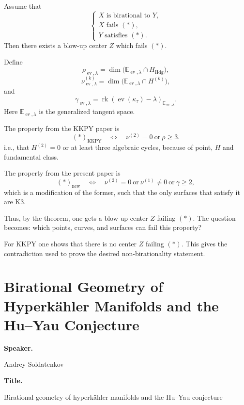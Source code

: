\begin{corollary}
\label{lemma-iritani-corollary2}
Assume that
\[
\begin{cases}
X\text{ is birational to }Y,\\
X\text{ fails }(*),\\
Y\text{ satisfies }(*).
\end{cases}
\]
Then there exists a blow-up center
$Z$ which fails $(*)$.
\end{corollary}

Define
\[
\rho_{\operatorname{ev},\lambda}
=
\dim
\bigl(
\mathbb{E}_{\operatorname{ev},\lambda}
\cap H_{\mathrm{Hdg}}
\bigr),
\]
\[
\nu^{(k)}_{\operatorname{ev},\lambda}
=
\dim
\bigl(
\mathbb{E}_{\operatorname{ev},\lambda}
\cap H^{(k)}
\bigr),
\]
and
\[
\gamma_{\operatorname{ev},\lambda}
=
\operatorname{rk}
\left(
\operatorname{ev}(\kappa_\tau)-\lambda
\right)_
{\mathbb{E}_{\operatorname{ev},\lambda}}.
\]
Here
$\mathbb{E}_{\operatorname{ev},\lambda}$
is the generalized tangent space.

The property from the KKPY paper is
\[
(*)_{\mathrm{KKPY}}
\quad
\Longleftrightarrow
\quad
\nu^{(2)}=0
\ \text{or}\
\rho\geq 3.
\]
i.e., that $H^{(2)}=0$ or
at least three algebraic cycles,
because of
point, $H$ and fundamental class.

The property from the present paper is
\[
(*)_{\mathrm{new}}
\quad
\Longleftrightarrow
\quad
\nu^{(2)}=0
\ \text{or}\
\nu^{(1)}\neq 0
\ \text{or}\
\gamma\geq 2,
\]
which is a modification of the former,
such that the only surfaces that satisfy it
are K3.

Thus, by the theorem, one gets a
blow-up center $Z$ failing $(*)$.
The question becomes:
which points, curves, and surfaces can
fail this property?

For KKPY one shows that there is no
center $Z$ failing $(*)$.
This gives the contradiction used to
prove the desired non-birationality
statement.

\section{Birational Geometry of
Hyperk\"ahler Manifolds and the
Hu--Yau Conjecture}
\label{label-hodge-birational3}

\medskip\noindent
{\bf Speaker.}

Andrey Soldatenkov

\medskip\noindent
{\bf Title.}

Birational geometry of hyperk\"ahler
manifolds and the Hu--Yau conjecture

